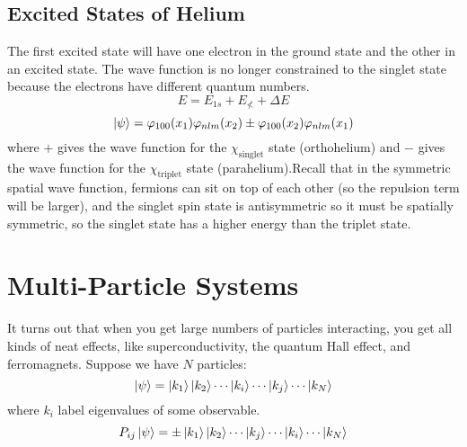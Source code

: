 \documentclass[a4paper,twoside,master.tex]{subfiles}
\begin{document}
\subsection{Excited States of Helium}
\label{sub:excited_states_of_helium}

The first excited state will have one electron in the ground state and the other in an excited state. The wave function is no longer constrained to the singlet state because the electrons have different quantum numbers.
\begin{equation}
    E = E_{1s} + E_{\nless} + \Delta E
\end{equation}
\begin{equation}
    \ket{\psi} = \varphi_{100}(x_1) \varphi_{nlm}(x_2) \pm \varphi_{100}(x_2) \varphi_{nlm}(x_1)
\end{equation}
where $ + $ gives the wave function for the $ \chi_{\text{singlet}} $ state (orthohelium) and $ - $ gives the wave function for the $ \chi_{\text{triplet}} $ state (parahelium).Recall that in the symmetric spatial wave function, fermions can sit on top of each other (so the repulsion term will be larger), and the singlet spin state is antisymmetric so it must be spatially symmetric, so the singlet state has a higher energy than the triplet state.


\section{Multi-Particle Systems}
\label{sec:multi-particle_systems}

It turns out that when you get large numbers of particles interacting, you get all kinds of neat effects, like superconductivity, the quantum Hall effect, and ferromagnets. Suppose we have $ N $ particles:
\begin{equation}
    \ket{\psi} =\ket{k_1}\ket{k_2}\cdots\ket{k_i} \cdots\ket{k_j} \cdots\ket{k_N}
\end{equation}
where $ k_i $ label eigenvalues of some observable.
\begin{equation}
    P_{ij}\ket{\psi} = \pm\ket{k_1}\ket{k_2} \cdots\ket{k_j} \cdots\ket{k_i} \cdots\ket{k_N}
\end{equation}
\end{document}
